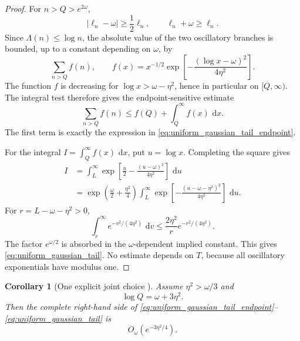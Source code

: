 \documentclass[11pt]{amsart}
\numberwithin{equation}{section}
\theoremstyle{plain}
\newtheorem{corollary}[theorem]{Corollary}
\theoremstyle{definition}
\theoremstyle{remark}
\newcommand{\1}{\mathbf{1}}
\newcommand{\dd}{\,\mathrm{d}}
\begin{document}
\begin{proof}
For \(n>Q>e^{2\omega}\),
\begin{equation}
|\ell_n-\omega|\geq\frac12\ell_n,
\qquad
\ell_n+\omega\geq\ell_n.
\label{eq:tail_denominator_bounds_detailed}
\end{equation}
Since \(\Lambda(n)\leq\log n\), the absolute value of the two oscillatory
branches is bounded, up to a constant depending on \(\omega\), by
\begin{equation}
\sum_{n>Q}f(n),
\qquad
f(x)
=
x^{-1/2}
\exp\left[-\frac{(\log x-\omega)^2}{4\eta^2}\right].
\label{eq:tail_integer_sum_detailed}
\end{equation}
The function \(f\) is decreasing for
\(\log x>\omega-\eta^2\), hence in particular on \([Q,\infty)\).
The integral test therefore gives the endpoint-sensitive estimate
\begin{equation}
\sum_{n>Q}f(n)
\leq
f(Q)+\int_Q^\infty f(x)\,\dd x.
\label{eq:tail_sum_endpoint_integral}
\end{equation}
The first term is exactly the expression in
\eqref{eq:uniform_gaussian_tail_endpoint}.

For the integral \(I=\int_Q^\infty f(x)\,\dd x\), put \(u=\log x\).
Completing the square gives
\begin{align}
I
&=
\int_L^\infty
\exp\left[
\frac u2-
\frac{(u-\omega)^2}{4\eta^2}
\right]\,\dd u
\label{eq:tail_square_one}
\\
&=
\exp\left(\frac\omega2+\frac{\eta^2}{4}\right)
\int_L^\infty
\exp\left[-
\frac{(u-\omega-\eta^2)^2}{4\eta^2}
\right]\,\dd u.
\label{eq:tail_square_two}
\end{align}
For \(r=L-\omega-\eta^2>0\),
\begin{equation}
\int_r^\infty e^{-v^2/(4\eta^2)}\,\dd v
\leq
\frac{2\eta^2}{r}e^{-r^2/(4\eta^2)}.
\label{eq:gaussian_tail_elementary}
\end{equation}
The factor \(e^{\omega/2}\) is absorbed in the
\(\omega\)-dependent implied constant.  This gives
\eqref{eq:uniform_gaussian_tail}.  No estimate depends on \(T\), because
all oscillatory exponentials have modulus one.
\end{proof}


\begin{corollary}[One explicit joint choice {}]
\label{cor:joint_Q_eta_choice}
Assume \(\eta^2>\omega/3\) and
\begin{equation}
\log Q=\omega+3\eta^2.
\label{eq:joint_Q_eta_choice}
\end{equation}
Then the complete right-hand side of
\eqref{eq:uniform_gaussian_tail_endpoint}--
\eqref{eq:uniform_gaussian_tail} is
\begin{equation}
O_\omega(e^{-3\eta^2/4}).
\label{eq:joint_Q_eta_decay}
\end{equation}
\end{corollary}
\end{document}
